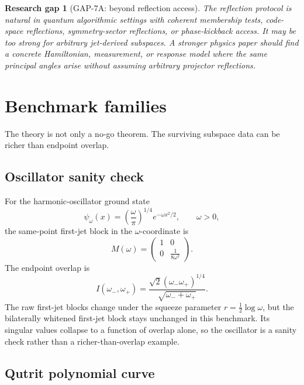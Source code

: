 \documentclass[11pt]{amsart}
\newtheorem{gap}[theorem]{Research gap}
\begin{document}
\begin{gap}[GAP-7A: beyond reflection access]
The reflection protocol is natural in quantum algorithmic settings with
coherent membership tests, code-space reflections, symmetry-sector reflections,
or phase-kickback access. It may be too strong for arbitrary jet-derived
subspaces. A stronger physics paper should find a concrete Hamiltonian,
measurement, or response model where the same principal angles arise without
assuming arbitrary projector reflections.
\end{gap}

\section{Benchmark families}

The theory is not only a no-go theorem. The surviving subspace data can be
richer than endpoint overlap.

\subsection{Oscillator sanity check}

For the harmonic-oscillator ground state
\[
        \psi_\omega(x)=
        \left(\frac{\omega}{\pi}\right)^{1/4}e^{-\omega x^2/2},
        \qquad \omega>0,
\]
the same-point first-jet block in the \(\omega\)-coordinate is
\[
        M(\omega)=
        \begin{pmatrix}
        1&0\\
        0&\frac{1}{8\omega^2}
        \end{pmatrix}.
\]
The endpoint overlap is
\[
        I(\omega_-,\omega_+)=
        \frac{\sqrt2(\omega_-\omega_+)^{1/4}}
             {\sqrt{\omega_-+\omega_+}}.
\]
The raw first-jet blocks change under the squeeze parameter
\(r=\frac12\log\omega\), but the bilaterally whitened first-jet block stays
unchanged in this benchmark. Its singular values collapse to a function of
overlap alone, so the oscillator is a sanity check rather than a
richer-than-overlap example.

\subsection{Qutrit polynomial curve}
\end{document}

